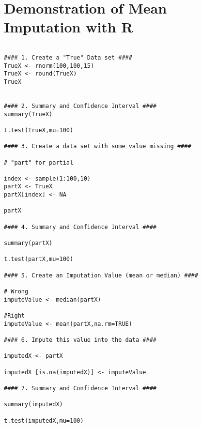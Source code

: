 \documentclass[]{article}
\begin{document}
\section*{Demonstration of Mean Imputation with R}
\begin{framed}
\begin{verbatim}

#### 1. Create a "True" Data set ####
TrueX <- rnorm(100,100,15)
TrueX <- round(TrueX)
TrueX


#### 2. Summary and Confidence Interval ####
summary(TrueX)

t.test(TrueX,mu=100)

#### 3. Create a data set with some value missing ####

# "part" for partial

index <- sample(1:100,10)
partX <- TrueX 
partX[index] <- NA

partX

#### 4. Summary and Confidence Interval ####

summary(partX)

t.test(partX,mu=100)

#### 5. Create an Imputation Value (mean or median) ####

# Wrong
imputeValue <- median(partX)

#Right
imputeValue <- mean(partX,na.rm=TRUE)

#### 6. Impute this value into the data ####

imputedX <- partX

imputedX [is.na(imputedX)] <- imputeValue

#### 7. Summary and Confidence Interval ####

summary(imputedX)

t.test(imputedX,mu=100)

\end{verbatim}
\end{framed}
\end{document}
